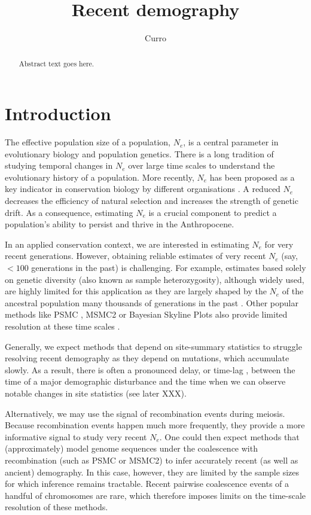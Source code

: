 \documentclass[12pt]{article}
\title{Recent demography}
\author[1]{Curro}
\affil[1]{University of Antwerp}
\date{}
\begin{document}
\maketitle

\begin{abstract}
	Abstract text goes here.
\end{abstract}

\linenumbers

\section{Introduction}


The effective population size of a population, $N_e$, is a central parameter in evolutionary biology and population genetics. There is a long tradition of studying temporal changes in $N_e$ over large time scales to understand the evolutionary history of a population. More recently, $N_e$ has been proposed as a key indicator in conservation biology by different organisations \citep{van_Oosterhout_2026}. A reduced $N_e$ decreases the efficiency of natural selection and increases the strength of genetic drift. As a consequence, estimating $N_e$ is a crucial component to predict a population's ability to persist and thrive in the Anthropocene.

In an applied conservation context, we are interested in estimating $N_e$ for very recent generations. However, obtaining reliable estimates of very recent $N_e$ (say, $< 100$ generations in the past) is challenging. For example, estimates based solely on genetic diversity (also known as sample heterozygosity), although widely used, are highly limited for this application as they are largely shaped by the $N_e$ of the ancestral population many thousands of generations in the past \citep{van_Oosterhout_2026}. Other popular methods like PSMC \citep{Liu_2016}, MSMC2 \citep{Schiffels_2020} or Bayesian Skyline Plots \citep{Drummond_2005} also provide limited resolution at these time scales \citep{van_Oosterhout_2026}.

Generally, we expect methods that depend on site-summary statistics to struggle resolving recent demography as they depend on mutations, which accumulate slowly. As a result, there is often a pronounced delay, or time-lag \citep{Gargiulo_2025}, between the time of a major demographic disturbance and the time when we can observe notable changes in site statistics (see later XXX).

Alternatively, we may use the signal of recombination events during meiosis. Because recombination events happen much more frequently, they provide a more informative signal to study very recent $N_e$. One could then expect methods that (approximately) model genome sequences under the coalescence with recombination (such as PSMC or MSMC2) to infer accurately recent (as well as ancient) demography. In this case, however, they are limited by the sample sizes for which inference remains tractable. Recent pairwise coalescence events of a handful of chromosomes are rare, which therefore imposes limits on the time-scale resolution of these methods.
\end{document}
